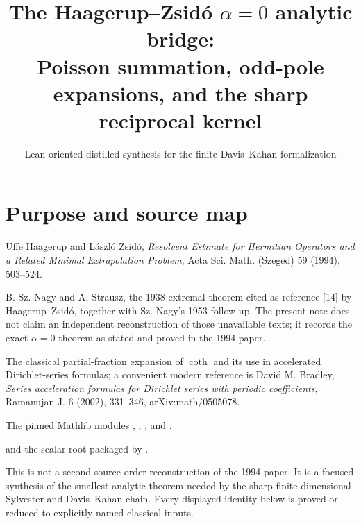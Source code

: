 
\newcommand{\cothh}{\operatorname{coth}}
\newcommand{\sgn}{\operatorname{sgn}}
\newcommand{\Lap}{\mathcal{L}}
\newcommand{\FT}{\mathcal{F}}
\newcommand{\Ioi}{(0,\infty)}
\renewenvironment{formalizationmap}{%
  \begin{longtable}{@{}>{\raggedright\arraybackslash}p{0.19\textwidth}>{\raggedright\arraybackslash}p{0.31\textwidth}>{\raggedright\arraybackslash}p{0.41\textwidth}@{}}%
  \toprule Source item & Modern mathematical content & Repository status \\\midrule\endhead%
}{\bottomrule\end{longtable}}
\title{The Haagerup--Zsid\'o \texorpdfstring{$\alpha=0$}{alpha=0} analytic bridge:\\
Poisson summation, odd-pole expansions, and the sharp reciprocal kernel}
\author{}
\date{Lean-oriented distilled synthesis for the finite Davis--Kahan formalization}

\maketitle

\section*{Purpose and source map}
\begin{sourceguide}
\item[Primary analytic source]
Uffe Haagerup and L\'aszl\'o Zsid\'o, \emph{Resolvent Estimate for Hermitian Operators and a Related Minimal Extrapolation Problem}, Acta Sci. Math. (Szeged) 59 (1994), 503--524.
\item[Earlier $\alpha=0$ source]
B. Sz.-Nagy and A. Strausz, the 1938 extremal theorem cited as reference [14] by Haagerup--Zsid\'o, together with Sz.-Nagy's 1953 follow-up. The present note does not claim an independent reconstruction of those unavailable texts; it records the exact $\alpha=0$ theorem as stated and proved in the 1994 paper.
\item[Partial-fraction source]
The classical partial-fraction expansion of $\cothh$ and its use in accelerated Dirichlet-series formulas; a convenient modern reference is David M. Bradley, \emph{Series acceleration formulas for Dirichlet series with periodic coefficients}, Ramanujan J. 6 (2002), 331--346, arXiv:math/0505078.
\item[Formal Poisson source]
The pinned Mathlib modules , , , and .
\item[Repository target]
 and the scalar root packaged by .
\item[Scope]
This is not a second source-order reconstruction of the 1994 paper. It is a focused synthesis of the smallest analytic theorem needed by the sharp finite-dimensional Sylvester and Davis--Kahan chain. Every displayed identity below is proved or reduced to explicitly named classical inputs.
\end{sourceguide}


